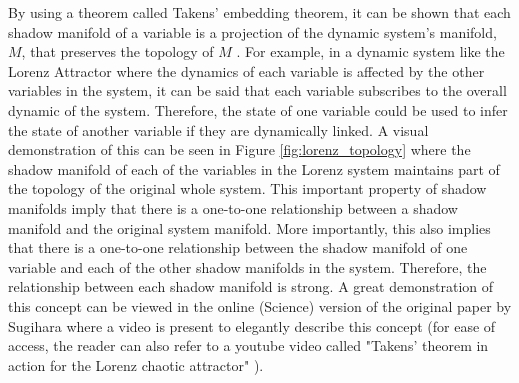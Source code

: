 By using a theorem called Takens' embedding theorem, it can be shown that each shadow manifold of a variable is a projection of the dynamic system's manifold, $M$, that preserves the topology of $M$ \cite{Dixon1999,Deyle2011,Takens1981}. For example, in a dynamic system like the Lorenz Attractor where the dynamics of each variable is affected by the other variables in the system, it can be said that each variable subscribes to the overall dynamic of the system. Therefore, the state of one variable could be used to infer the state of another variable if they are dynamically linked. A visual demonstration of this can be seen in Figure \ref{fig:lorenz_topology} where the shadow manifold of each of the variables in the Lorenz system maintains part of the topology of the original whole system. This important property of shadow manifolds imply that there is a one-to-one relationship between a shadow manifold and the original system manifold. More importantly, this also implies that there is a one-to-one relationship between the shadow manifold of one variable and each of the other shadow manifolds in the system. Therefore, the relationship between each shadow manifold is strong. A great demonstration of this concept can be viewed in the online (Science) version of the original paper by Sugihara \cite{Sugihara2012} where a video is present to elegantly describe this concept (for ease of access, the reader can also refer to a youtube video called "Takens' theorem in action for the Lorenz chaotic attractor" \cite{TakensYoutube2012}). 

